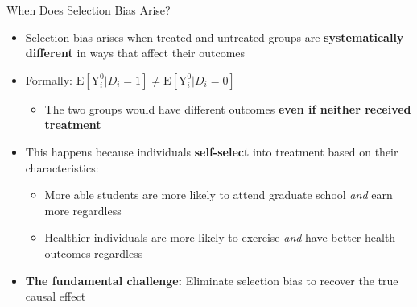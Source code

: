 \documentclass[hyperref={pdfpagelabels=false}]{beamer}
\begin{document}
\begin{frame}{When Does Selection Bias Arise?}
	\begin{itemize}
		\item Selection bias arises when treated and untreated groups are \textbf{systematically different} in ways that affect their outcomes
		\vspace{0.3cm}
		\item Formally: $\mathrm{E}[\mathrm{Y}^{0}_{i}|D_i=1] \neq \mathrm{E}[\mathrm{Y}^{0}_{i}|D_i=0]$
		\vspace{0.1cm}
		\begin{itemize}
			\item The two groups would have different outcomes \textbf{even if neither received treatment}
		\end{itemize}
		\vspace{0.3cm}
		\item This happens because individuals \textbf{self-select} into treatment based on their characteristics:
		\vspace{0.2cm}
		\begin{itemize}
			\item More able students are more likely to attend graduate school \emph{and} earn more regardless
			\vspace{0.2cm}
			\item Healthier individuals are more likely to exercise \emph{and} have better health outcomes regardless
		\end{itemize}
		\vspace{0.3cm}
		\item \textbf{The fundamental challenge:} Eliminate selection bias to recover the true causal effect
	\end{itemize}
\end{frame}
	
\end{document}
